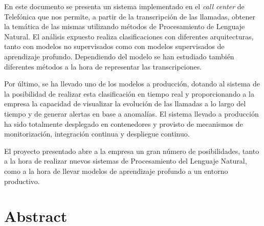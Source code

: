 
En este documento se presenta un sistema implementado en el \textit{call center} de Telefónica que nos 
 permite, a partir de la transcripción de las llamadas, obtener la temática de las mismas utilizando métodos de Procesamiento de Lenguaje Natural. El análisis expuesto realiza clasificaciones con diferentes arquitecturas, tanto con modelos no supervisados como con modelos supervisados de aprendizaje profundo. Dependiendo del modelo se han estudiado también diferentes métodos a la hora de representar las transcripciones.
 
 Por último, se ha llevado uno de los modelos a producción, dotando al sistema de la posibilidad de realizar esta clasificación en tiempo real y proporcionando a la empresa la capacidad de visualizar la evolución de las llamadas a lo largo del tiempo y de generar alertas en base a anomalías. El sistema llevado a producción ha sido totalmente desplegado en contenedores y provisto de mecanismos  de monitorización, integración continua y despliegue continuo. 
 
El proyecto presentado abre a la empresa un gran número de posibilidades, tanto a la hora de  realizar nuevos sistemas de Procesamiento del Lenguaje Natural, como a la hora de llevar modelos de aprendizaje profundo a un entorno productivo.
 








\chapter*{Abstract}






\onehalfspacing


